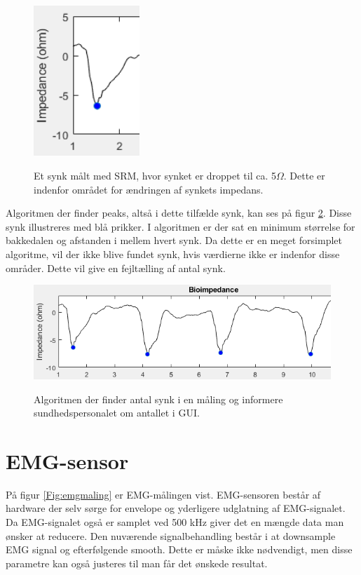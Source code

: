 \begin{figure}[H]
\centering
{\includegraphics[width=4cm]
{Figure/synkfraGUI5ohm}}
\caption{Et synk målt med SRM, hvor synket er droppet til ca. 5$\Omega$. Dette er indenfor området for ændringen af synkets impedans.}
\label{Fig:synkfraGUI5ohm}
\end{figure} 

Algoritmen der finder peaks, altså i dette tilfælde synk, kan ses på figur \ref{Fig:synkfundet}. Disse synk illustreres med blå prikker. I algoritmen er der sat en minimum størrelse for bakkedalen og afstanden i mellem hvert synk. Da dette er en meget forsimplet algoritme, vil der ikke blive fundet synk, hvis værdierne ikke er indenfor disse områder. Dette vil give en fejltælling af antal synk.

\begin{figure}[H]
\centering
{\includegraphics[width=\linewidth]
{Figure/synkfundet}}
\caption{Algoritmen der finder antal synk i en måling og informere sundhedspersonalet om antallet i GUI.}
\label{Fig:synkfundet}
\end{figure} 



\section{EMG-sensor}

På figur \ref{Fig:emgmaling} er EMG-målingen vist. EMG-sensoren består af hardware der selv sørge for envelope og yderligere udglatning af EMG-signalet. Da EMG-signalet også er samplet ved 500 kHz giver det en mængde data man ønsker at reducere. Den nuværende signalbehandling består i at downsample EMG signal og efterfølgende smooth. Dette er måske ikke nødvendigt, men disse parametre kan også justeres til man får det ønskede resultat. 

